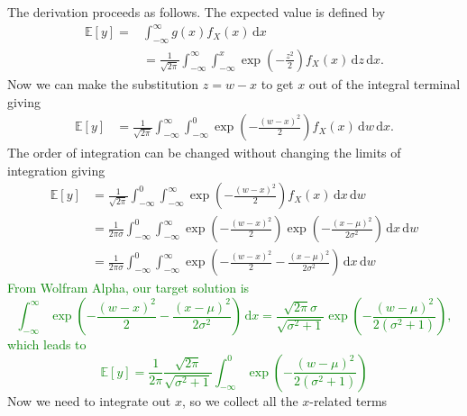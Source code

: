 \documentclass[]{article}
\newcommand{\dean}[1]{\textcolor{green}{#1}}
\begin{document}
The derivation proceeds as follows. The expected value is defined by
\begin{align}
\mathbb{E}\left[y\right] =& \int_{-\infty}^{\infty}g(x)f_X(x)\,\mathrm{d}x \\
	&=\frac{1}{\sqrt{2\pi}}\int_{-\infty}^{\infty}\int_{-\infty}^{x}\exp\left(-\frac{z^2}{2}\right)f_X(x)\,\mathrm{d}z\,\mathrm{d}x.
\end{align}
Now we can make the substitution $z=w-x$ to get $x$ out of the integral terminal giving
\begin{align}
\mathbb{E}\left[y\right] &=\frac{1}{\sqrt{2\pi}} \int_{-\infty}^{\infty} \int_{-\infty}^{0} \exp\left(-\frac{\left(w-x\right)^2}{2}\right)f_X(x) \, \mathrm{d}w\,\mathrm{d}x.
\end{align}
The order of integration can be changed without changing the limits of integration giving
\begin{align}
\mathbb{E}\left[y\right]  &= \frac{1}{\sqrt{2\pi}} \int_{-\infty}^{0} \int_{-\infty}^{\infty} \exp\left(-\frac{\left(w-x\right)^2}{2}\right)f_X(x) \, \mathrm{d}x\,\mathrm{d}w \\	
&=\frac{1}{2\pi\sigma}\int_{-\infty}^{0}\int_{-\infty}^{\infty}\exp\left(-\frac{\left(w-x\right)^2}{2}\right)\exp\left(-\frac{(x-\mu)^2}{2\sigma^2}\right)\,\mathrm{d}x\,\mathrm{d}w \\
&=\frac{1}{2\pi\sigma}\int_{-\infty}^{0}\int_{-\infty}^{\infty}\exp\left(-\frac{\left(w-x\right)^2}{2}-\frac{(x-\mu)^2}{2\sigma^2}\right)\,\mathrm{d}x\,\mathrm{d}w
\end{align}
\dean{From Wolfram Alpha, our target solution is
\begin{equation}
	\int_{-\infty}^{\infty}\exp\left(-\frac{\left(w-x\right)^2}{2}-\frac{(x-\mu)^2}{2\sigma^2}\right)\,\mathrm{d}x = \frac{\sqrt{2\pi}\sigma}{\sqrt{\sigma^2+1}}\exp\left(-\frac{\left(w-\mu\right)^2}{2\left(\sigma^2+1\right)}\right),
\end{equation}
which leads to 
\begin{equation}
	\mathbb{E}\left[y\right] = \frac{1}{2\pi}\frac{\sqrt{2\pi}}{\sqrt{\sigma^2+1}} \int_{-\infty}^{0}\exp\left(-\frac{\left(w-\mu\right)^2}{2\left(\sigma^2+1\right)}\right)
\end{equation}}
Now we need to integrate out $x$, so we collect all the $x$-related terms
\end{document}
